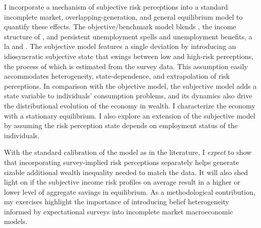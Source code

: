 I incorporate a mechanism of subjective risk perceptions into a standard incomplete market, overlapping-generation, and general equilibrium model to quantify these effects. The objective/benchmark model blends \cite{huggett1996wealth}, the income structure of \cite{carroll1997nature}, and persistent unemployment spells and unemployment benefits, a la \cite{krueger2016macroeconomics} and \cite{carroll2017distribution}. The subjective model features a single deviation by introducing an idiosyncratic subjective state that swings between low and high-risk perceptions, the process of which is estimated from the survey data. This assumption easily accommodates heterogeneity, state-dependence, and extrapolation of risk perceptions. In comparison with the objective model, the subjective model adds a state variable to individuals' consumption problems, and its dynamics also drive the distributional evolution of the economy in wealth. I characterize the economy with a stationary equilibrium. I also explore an extension of the subjective model by assuming the risk perception state depends on employment status of the individuals. 

With the standard calibration of the model as in the literature, I \emph{expect} to show that incorporating survey-implied risk perceptions separately helps generate sizable additional wealth inequality needed to match the data. It will also shed light on if the subjective income risk profiles on average result in a higher or lower level of aggregate savings in equilibrium. As a methodological contribution, my exercises highlight the importance of introducing belief heterogeneity informed by expectational surveys into incomplete market macroeconomic models.  


